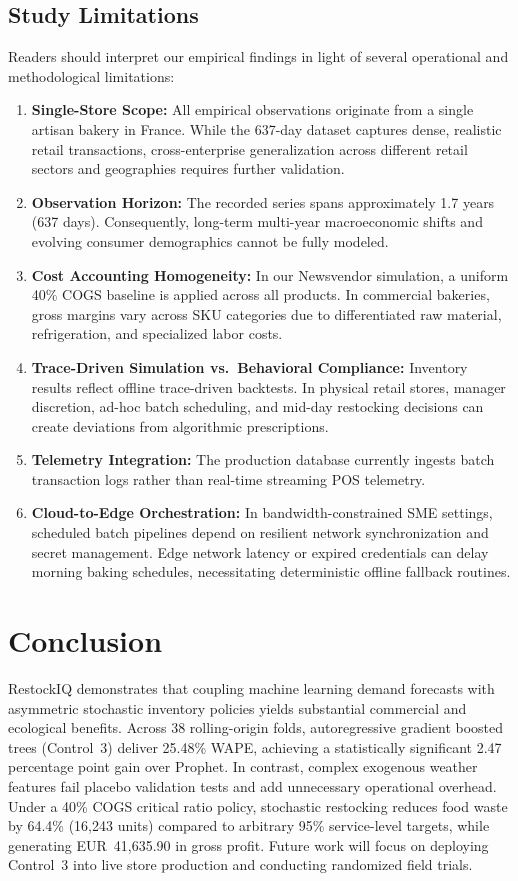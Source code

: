 \documentclass[conference]{IEEEtran}
\begin{document}
\subsection{Study Limitations}
Readers should interpret our empirical findings in light of several operational and methodological limitations:
\begin{enumerate}
    \item \textbf{Single-Store Scope:} All empirical observations originate from a single artisan bakery in France. While the 637-day dataset captures dense, realistic retail transactions, cross-enterprise generalization across different retail sectors and geographies requires further validation.
    \item \textbf{Observation Horizon:} The recorded series spans approximately 1.7 years (637 days). Consequently, long-term multi-year macroeconomic shifts and evolving consumer demographics cannot be fully modeled.
    \item \textbf{Cost Accounting Homogeneity:} In our Newsvendor simulation, a uniform 40\% COGS baseline is applied across all products. In commercial bakeries, gross margins vary across SKU categories due to differentiated raw material, refrigeration, and specialized labor costs.
    \item \textbf{Trace-Driven Simulation vs.\ Behavioral Compliance:} Inventory results reflect offline trace-driven backtests. In physical retail stores, manager discretion, ad-hoc batch scheduling, and mid-day restocking decisions can create deviations from algorithmic prescriptions.
    \item \textbf{Telemetry Integration:} The production database currently ingests batch transaction logs rather than real-time streaming POS telemetry.
    \item \textbf{Cloud-to-Edge Orchestration:} In bandwidth-constrained SME settings, scheduled batch pipelines depend on resilient network synchronization and secret management. Edge network latency or expired credentials can delay morning baking schedules, necessitating deterministic offline fallback routines.
\end{enumerate}

\section{Conclusion}
RestockIQ demonstrates that coupling machine learning demand forecasts with asymmetric stochastic inventory policies yields substantial commercial and ecological benefits. Across 38 rolling-origin folds, autoregressive gradient boosted trees (Control~3) deliver 25.48\% WAPE, achieving a statistically significant 2.47 percentage point gain over Prophet. In contrast, complex exogenous weather features fail placebo validation tests and add unnecessary operational overhead. Under a 40\% COGS critical ratio policy, stochastic restocking reduces food waste by 64.4\% (16,243 units) compared to arbitrary 95\% service-level targets, while generating EUR~41,635.90 in gross profit. Future work will focus on deploying Control~3 into live store production and conducting randomized field trials.



\end{document}
